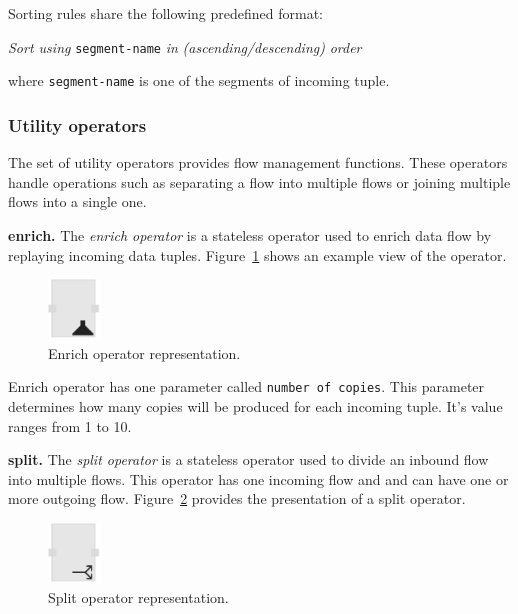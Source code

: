 Sorting rules share the following predefined format:

\textit{Sort using} \texttt{segment-name} \textit{in} \textit{(ascending/descending)} \textit{order}

where \texttt{segment-name} is one of the segments of incoming tuple.

\subsubsection{Utility operators}
\label{sec:utility operators}
The set of utility operators provides flow management functions. These operators 
handle operations such as separating a flow into multiple flows or joining multiple 
flows into a single one.

\textbf{enrich.}
The \textit{enrich operator} is a stateless operator used to enrich data flow by 
replaying incoming data tuples. Figure~\ref{fig:enrich operator} shows an example 
view of the operator.

\begin{figure}[ht]
	\centering
	\includegraphics[height=60px]{figures/EnrichOperator.pdf}
	\caption{Enrich operator representation.}
	\label{fig:enrich operator}
\end{figure}

Enrich operator has one parameter called \texttt{number of copies}. This parameter 
determines how many copies will be produced for each incoming tuple. It's value 
ranges from 1 to 10.

\textbf{split.}
The \textit{split operator} is a stateless operator used to divide an inbound flow 
into multiple flows. This operator has one incoming flow and and can have one or 
more outgoing flow. Figure~\ref{fig:split operator} provides the presentation of a 
split operator.

\begin{figure}[ht]
	\centering
	\includegraphics[height=60px]{figures/SplitOperator.pdf}
	\caption{Split operator representation.}
	\label{fig:split operator}
\end{figure}

